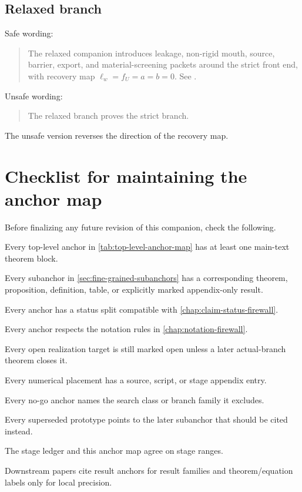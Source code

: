 \subsection{Relaxed branch}
\label{subsec:citation-wording-relaxed-branch}

Safe wording:
\begin{quote}
The relaxed companion introduces leakage, non-rigid mouth, source, barrier, export, and material-screening packets around the strict front end, with recovery map \(\ell_w=f_U=a=b=0\).  See .
\end{quote}

Unsafe wording:
\begin{quote}
The relaxed branch proves the strict branch.
\end{quote}
The unsafe version reverses the direction of the recovery map.

\section{Checklist for maintaining the anchor map}
\label{sec:anchor-maintenance-checklist}

Before finalizing any future revision of this companion, check the following.

\begin{verificationchecklist}
  \item Every top-level anchor in \cref{tab:top-level-anchor-map} has at least one main-text theorem block.
  \item Every subanchor in \cref{sec:fine-grained-subanchors} has a corresponding theorem, proposition, definition, table, or explicitly marked appendix-only result.
  \item Every anchor has a status split compatible with \cref{chap:claim-status-firewall}.
  \item Every anchor respects the notation rules in \cref{chap:notation-firewall}.
  \item Every open realization target is still marked open unless a later actual-branch theorem closes it.
  \item Every numerical placement has a source, script, or stage appendix entry.
  \item Every no-go anchor names the search class or branch family it excludes.
  \item Every superseded prototype points to the later subanchor that should be cited instead.
  \item The stage ledger and this anchor map agree on stage ranges.
  \item Downstream papers cite result anchors for result families and theorem/equation labels only for local precision.
\end{verificationchecklist}

